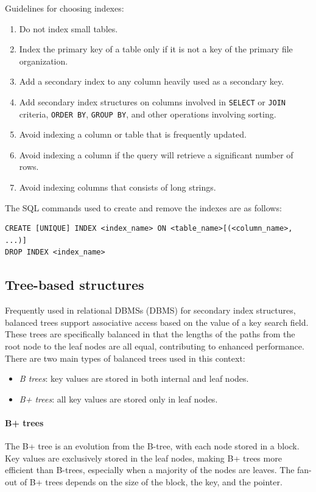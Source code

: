 Guidelines for choosing indexes:
\begin{enumerate}
  \item Do not index small tables. 
  \item Index the primary key of a table only if it is not a key of the primary file organization.
  \item Add a secondary index to any column heavily used as a secondary key.
  \item Add secondary index structures on columns involved in \texttt{SELECT} or \texttt{JOIN} criteria, \texttt{ORDER BY}, \texttt{GROUP BY}, and other operations involving sorting.
  \item Avoid indexing a column or table that is frequently updated.
  \item Avoid indexing a column if the query will retrieve a significant number of rows.
  \item Avoid indexing columns that consists of long strings.
\end{enumerate}

The SQL commands used to create and remove the indexes are as follows: 
\begin{lstlisting}[style=SQL]
CREATE [UNIQUE] INDEX <index_name> ON <table_name>[(<column_name>, ...)]
DROP INDEX <index_name>
\end{lstlisting}

\subsection{Tree-based structures}
Frequently used in relational DBMSs (DBMS) for secondary index structures, balanced trees support associative access based on the value of a key search field.
These trees are specifically balanced in that the lengths of the paths from the root node to the leaf nodes are all equal, contributing to enhanced performance. 
There are two main types of balanced trees used in this context:
\begin{itemize}
    \item \textit{B trees}: key values are stored in both internal and leaf nodes.
    \item \textit{B+ trees}: all key values are stored only in leaf nodes.
\end{itemize}

\paragraph*{B+ trees}
The B+ tree is an evolution from the B-tree, with each node stored in a block. 
Key values are exclusively stored in the leaf nodes, making B+ trees more efficient than B-trees, especially when a majority of the nodes are leaves. 
The fan-out of B+ trees depends on the size of the block, the key, and the pointer.


